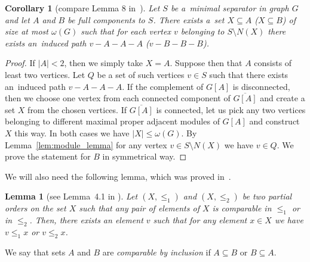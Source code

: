 \documentclass[11pt,a4paper]{article}
\newtheorem{lemma}[theorem]{Lemma}
\newtheorem{corollary}[theorem]{Corollary}
\theoremstyle{definition}
\begin{document}
\begin{corollary}[compare Lemma 8 in~\cite{pilipczuk2023polynomial}]\label{cor:X_A}
Let $S$ be a~minimal separator in graph $G$ and let $A$ and $B$ be full components to $S$. There exists a~set $X\subseteq A$ ($X\subseteq B$) of size at most $\omega(G)$ such that for each vertex $v$ belonging to $S\setminus N(X)$  there exists an~induced path $v-A-A-A$ ($v-B-B-B$).
\end{corollary}
\begin{proof}
If $|A|<2$, then we simply take $X=A$. 
Suppose then that $A$ consists of least two vertices. Let $Q$ be a set of such vertices $v\in S$ such that there exists an~induced path $v-A-A-A$. If the complement of $G[A]$ is disconnected, then we choose one vertex from each connected component of $\overline{G[A]}$ and create a set $X$ from the chosen vertices. If $\overline{G[A]}$ is connected, let us pick any two vertices belonging to different maximal proper adjacent modules of $G[A]$ and construct $X$ this way. In both cases we have $|X|\leq \omega(G)$. By Lemma~\ref{lem:module_lemma} for any vertex $v\in S\setminus N(X)$ we have $v\in Q$. We prove the statement for $B$ in symmetrical way.  
\end{proof}

We will also need the following lemma, which was proved in~\cite{grzesik2020polynomialtime}.
\begin{lemma}[see Lemma~4.1 in \cite{grzesik2020polynomialtime}]\label{lem:two_orders}
    Let $(X,\leq_1)$ and $(X,\leq_2)$ be two partial orders on the set $X$ such that any pair of elements of $X$ is comparable in $\leq_1$ or in $\leq_2$. Then, there exists an element $v$ such that for any element $x\in X$ we have $v \leq_1 x$ or $v \leq_2 x$.
\end{lemma}

We say that sets $A$ and $B$ are {\it comparable by inclusion} if $A\subseteq B$ or $B\subseteq A$.
\end{document}
